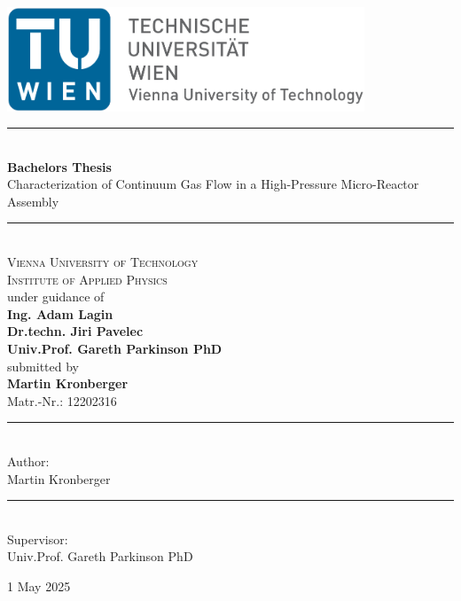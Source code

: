 \thispagestyle{empty}

\newcommand{\HRule}{\rule{\linewidth}{0.5mm}} %

\includegraphics[width=0.8\textwidth]{src/00_intro/logo_en.jpg}

\vspace{2cm}

\begin{center} %

\HRule \\[0.4cm]
{\Huge \bfseries Bachelors Thesis}\\[0.5cm] %
{\Large Characterization of Continuum Gas Flow in a High-Pressure Micro-Reactor Assembly}
\HRule \\[2cm]

\textsc{\LARGE Vienna University of Technology}\\[0.5cm] 
\textsc{\Large Institute of Applied Physics}\\[1cm]

{under guidance of}\\[0.3cm]

\textbf{Ing. Adam Lagin}\\
\textbf{Dr.techn. Jiri Pavelec}\\
\textbf{Univ.Prof. Gareth Parkinson PhD}\\[0.5cm]

{submitted by}\\[0.3cm]
\textbf{Martin Kronberger}\\
{Matr.-Nr.: 12202316}

\vfill

\begin{minipage}[t]{0.4\textwidth}
\begin{flushleft}
\rule{6cm}{0.4pt} \\[0.2cm]
Author:\\
Martin Kronberger
\end{flushleft}
\end{minipage}
\hfill
\begin{minipage}[t]{0.4\textwidth}
\begin{flushleft}
\rule{6cm}{0.4pt} \\[0.2cm]
Supervisor:\\
Univ.Prof. Gareth Parkinson PhD
\end{flushleft}
\end{minipage}

\vspace{1cm}

{\large 1 May 2025}
\end{center}

\blankpage
